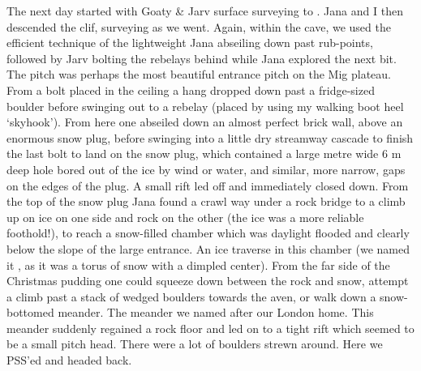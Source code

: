 

The next day started with Goaty \& Jarv surface surveying to . Jana
and I then descended the clif, surveying as we went. Again, within the
cave, we used the efficient technique of the lightweight Jana abseiling
down past rub-points, followed by Jarv bolting the rebelays behind while
Jana explored the next bit. The pitch was perhaps the most beautiful
entrance pitch on the Mig plateau. From a bolt placed in the ceiling a
hang dropped down past a fridge-sized boulder before swinging out to a
rebelay (placed by using my walking boot heel `skyhook'). From here one
abseiled down an almost perfect brick wall, above an enormous snow plug,
before swinging into a little dry streamway cascade to finish the last
bolt to land on the snow plug, which contained a large metre wide 6 m
deep hole bored out of the ice by wind or water, and similar, more
narrow, gaps on the edges of the plug. A small rift led off and
immediately closed down. From the top of the snow plug Jana found a
crawl way under a rock bridge to a climb up on ice on one side and rock
on the other (the ice was a more reliable foothold!), to reach a
snow-filled chamber which was daylight flooded and clearly below the
slope of the large entrance. An ice traverse in this chamber (we named
it , as it was a torus of snow with a dimpled center).
From the far side of the Christmas pudding one could squeeze down
between the rock and snow, attempt a climb past a stack of wedged
boulders towards the aven, or walk down a snow-bottomed meander. The
meander we named  after our London home. This meander
suddenly regained a rock floor and led on to a tight rift which seemed
to be a small pitch head. There were a lot of boulders strewn around.
Here we PSS'ed and headed back.


    

